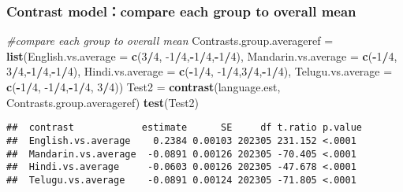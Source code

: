 \documentclass[]{article}
\newenvironment{Shaded}{\begin{snugshade}}{\end{snugshade}}
\newcommand{\CommentTok}[1]{\textcolor[rgb]{0.56,0.35,0.01}{\textit{#1}}}
\newcommand{\DataTypeTok}[1]{\textcolor[rgb]{0.13,0.29,0.53}{#1}}
\newcommand{\DecValTok}[1]{\textcolor[rgb]{0.00,0.00,0.81}{#1}}
\newcommand{\KeywordTok}[1]{\textcolor[rgb]{0.13,0.29,0.53}{\textbf{#1}}}
\newcommand{\NormalTok}[1]{#1}
\newcommand{\OperatorTok}[1]{\textcolor[rgb]{0.81,0.36,0.00}{\textbf{#1}}}
\newcommand{\StringTok}[1]{\textcolor[rgb]{0.31,0.60,0.02}{#1}}
\begin{document}
\hypertarget{contrast-modelcompare-each-group-to-overall-mean}{%
\subsubsection{Contrast model：compare each group to overall
mean}\label{contrast-modelcompare-each-group-to-overall-mean}}

\begin{Shaded}
\begin{Highlighting}[]
\CommentTok{#compare each group to overall mean}
\NormalTok{Contrasts.group.averageref =}\StringTok{ }\KeywordTok{list}\NormalTok{(}\DataTypeTok{English.vs.average =} \KeywordTok{c}\NormalTok{(}\DecValTok{3}\OperatorTok{/}\DecValTok{4}\NormalTok{, }\DecValTok{-1}\OperatorTok{/}\DecValTok{4}\NormalTok{,}\OperatorTok{-}\DecValTok{1}\OperatorTok{/}\DecValTok{4}\NormalTok{,}\OperatorTok{-}\DecValTok{1}\OperatorTok{/}\DecValTok{4}\NormalTok{), }\DataTypeTok{Mandarin.vs.average =} \KeywordTok{c}\NormalTok{(}\OperatorTok{-}\DecValTok{1}\OperatorTok{/}\DecValTok{4}\NormalTok{, }\DecValTok{3}\OperatorTok{/}\DecValTok{4}\NormalTok{,}\OperatorTok{-}\DecValTok{1}\OperatorTok{/}\DecValTok{4}\NormalTok{,}\OperatorTok{-}\DecValTok{1}\OperatorTok{/}\DecValTok{4}\NormalTok{), }\DataTypeTok{Hindi.vs.average =} \KeywordTok{c}\NormalTok{(}\OperatorTok{-}\DecValTok{1}\OperatorTok{/}\DecValTok{4}\NormalTok{, }\DecValTok{-1}\OperatorTok{/}\DecValTok{4}\NormalTok{,}\DecValTok{3}\OperatorTok{/}\DecValTok{4}\NormalTok{,}\OperatorTok{-}\DecValTok{1}\OperatorTok{/}\DecValTok{4}\NormalTok{), }\DataTypeTok{Telugu.vs.average =} \KeywordTok{c}\NormalTok{(}\OperatorTok{-}\DecValTok{1}\OperatorTok{/}\DecValTok{4}\NormalTok{, }\DecValTok{-1}\OperatorTok{/}\DecValTok{4}\NormalTok{,}\OperatorTok{-}\DecValTok{1}\OperatorTok{/}\DecValTok{4}\NormalTok{, }\DecValTok{3}\OperatorTok{/}\DecValTok{4}\NormalTok{))}
\NormalTok{Test2 =}\StringTok{ }\KeywordTok{contrast}\NormalTok{(language.est, Contrasts.group.averageref)}
\KeywordTok{test}\NormalTok{(Test2)}
\end{Highlighting}
\end{Shaded}

\begin{verbatim}
##  contrast            estimate      SE     df t.ratio p.value
##  English.vs.average    0.2384 0.00103 202305 231.152 <.0001 
##  Mandarin.vs.average  -0.0891 0.00126 202305 -70.405 <.0001 
##  Hindi.vs.average     -0.0603 0.00126 202305 -47.678 <.0001 
##  Telugu.vs.average    -0.0891 0.00124 202305 -71.805 <.0001
\end{verbatim}
\end{document}
